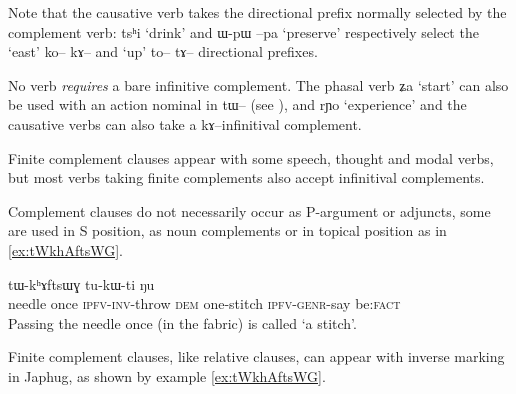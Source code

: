 \documentclass[oldfontcommands,oneside,a4paper,11pt]{article}
\newcommand{\ipa}[1]{{\phon #1}} %
\begin{document}
Note that the causative verb takes the directional prefix normally selected by the complement verb: \ipa{tsʰi} `drink' and \ipa{ɯ-pɯ} \ipa{--pa} `preserve'  respectively select the `east' \ipa{ko-- kɤ--} and `up' \ipa{to-- tɤ--} directional prefixes.

No verb \textit{requires} a bare infinitive complement. The phasal verb \ipa{ʑa} `start' can also be used with an action nominal in \ipa{tɯ--} (see \citealt[6-9]{jacques14antipassive}), and \ipa{rɲo} `experience' and the causative verbs can also take a \ipa{kɤ--}infinitival complement.

Finite complement clauses appear with some speech, thought and modal verbs, but most verbs taking finite complements also accept infinitival complements.

Complement clauses do not necessarily occur as P-argument or adjuncts, some are used in S position, as noun complements or in topical position as in \ref{ex:tWkhAftsWG}.


 \begin{exe}
\ex \label{ex:tWkhAftsWG}
\gll
[\ipa{taqaβ} 	\ipa{ci} 	\ipa{cʰɯ́-wɣ-lɤt}] 	\ipa{nɯ} 	\ipa{tɯ-kʰɤftsɯɣ} 	\ipa{tu-kɯ-ti} 	\ipa{ŋu} \\
needle once \textsc{ipfv-inv}-throw \textsc{dem} one-stitch \textsc{ipfv-genr}-say be:\textsc{fact} \\
\glt Passing the needle once (in the fabric) is called `a stitch'.
\end{exe}

Finite complement clauses, like relative clauses, can appear with inverse marking in Japhug, as shown by example \ref{ex:tWkhAftsWG}.
\end{document}
